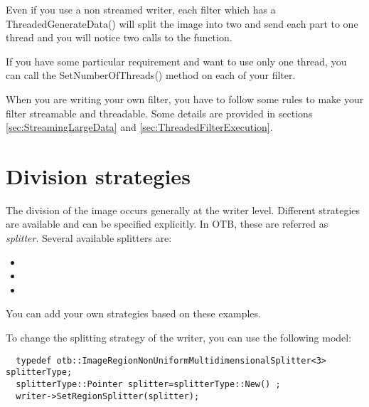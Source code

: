 Even if you use a non streamed writer, each filter which has a
ThreadedGenerateData() will split the image into two and send each part to one
thread and you will notice two calls to the function.

If you have some particular requirement and want to use only one thread, you can
call the SetNumberOfThreads() method on each of your filter. 

When you are writing your own filter, you have to follow some rules to make your
filter streamable and threadable. Some details are provided in sections 
\ref{sec:StreamingLargeData} and \ref{sec:ThreadedFilterExecution}.


\section{Division strategies}
%

The division of the image occurs generally at the writer level. Different 
strategies are available and can be specified explicitly. In OTB, these are 
referred as {\em splitter}. Several available splitters are:

\begin{itemize}
\item {}
\item {}
\item {}
\end{itemize}

You can add your own strategies based on these examples.

To change the splitting strategy of the writer, you can use the following model:

\begin{verbatim}
  typedef otb::ImageRegionNonUniformMultidimensionalSplitter<3> splitterType;
  splitterType::Pointer splitter=splitterType::New() ;
  writer->SetRegionSplitter(splitter);
\end{verbatim}


